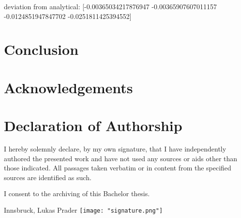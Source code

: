 \documentclass[12pt,a4paper]{article}
\begin{document}
deviation from analytical:
[-0.00365034217876947 -0.00365907607011157 -0.0124851947847702
 -0.0251811425394552]

\section{Conclusion} \label{sec:conclusion}


\section{Acknowledgements} \label{sec:acknowledgements}


\clearpage
\section*{Declaration of Authorship}

I hereby solemnly declare, by my own signature, that I have independently authored the presented work and have not used any sources or aids other than those indicated. All passages taken verbatim or in content from the specified sources are identified as such.

I consent to the archiving of this Bachelor thesis.

\hfill
\vspace{2cm} Innsbruck, \findate \hfill Lukas Prader \texttt{[image: "signature.png"]}


\newpage
\printbibliography[]

\end{document}
